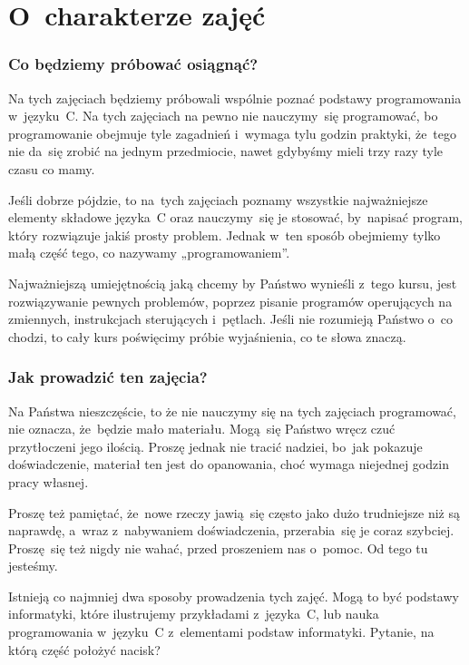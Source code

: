 \documentclass[10pt,t]{beamer}
\begin{document}
\section{O~charakterze zajęć}


\begin{frame}
  \frametitle{Co będziemy próbować osiągnąć?}


  Na tych zajęciach będziemy próbowali wspólnie poznać podstawy
  programowania w~języku~C. Na tych zajęciach na pewno \alert{nie}
  nauczymy~się programować, bo programowanie obejmuje tyle zagadnień
  i~wymaga tylu godzin praktyki, że~tego nie da~się zrobić na jednym
  przedmiocie, nawet gdybyśmy mieli trzy razy tyle czasu co mamy.

  Jeśli dobrze pójdzie, to na~tych zajęciach poznamy wszystkie
  najważniejsze elementy składowe języka~C oraz nauczymy~się je stosować,
  by~napisać program, który rozwiązuje jakiś prosty problem. Jednak
  w~ten sposób obejmiemy tylko małą część tego, co nazywamy
  „programowaniem”.

  Najważniejszą umiejętnością jaką chcemy by Państwo wynieśli z~tego kursu,
  jest rozwiązywanie pewnych problemów, poprzez pisanie programów
  operujących na zmiennych, instrukcjach sterujących i~pętlach.
  Jeśli nie rozumieją Państwo o~co chodzi, to cały kurs poświęcimy próbie
  wyjaśnienia, co te słowa znaczą.

\end{frame}





\begin{frame}
  \frametitle{Jak prowadzić ten zajęcia?}


  Na Państwa nieszczęście, to że nie nauczymy się na tych zajęciach
  programować, nie oznacza, że~będzie mało materiału. Mogą~się Państwo
  wręcz czuć przytłoczeni jego ilością. Proszę jednak nie tracić nadziei,
  bo~jak pokazuje doświadczenie, materiał ten jest do opanowania, choć
  wymaga niejednej godzin pracy własnej.

  Proszę też pamiętać, że~nowe rzeczy jawią~się często jako dużo
  trudniejsze niż są naprawdę, a~wraz z~nabywaniem doświadczenia,
  przerabia~się je coraz szybciej. Proszę~się też nigdy nie wahać, przed
  proszeniem nas o~pomoc. Od tego tu jesteśmy.

  Istnieją co najmniej dwa sposoby prowadzenia tych zajęć. Mogą to być
  \alert{podstawy informatyki}, które ilustrujemy przykładami z~języka~C,
  lub \alert{nauka programowania w~języku~C} z~elementami podstaw
  informatyki. Pytanie, na którą część położyć nacisk?

\end{frame}
\end{document}
